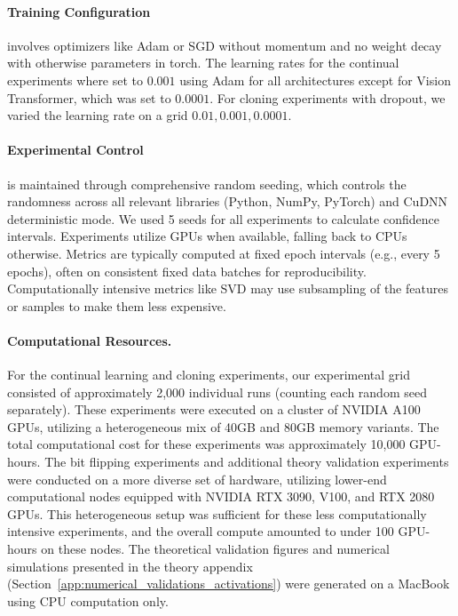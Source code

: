\documentclass{article}
\numberwithin{figure}{section}
\begin{document}
\paragraph{Training Configuration} involves optimizers like Adam or SGD without momentum and no weight decay with otherwise parameters in torch. The learning rates for the continual experiments where set to $0.001$ using Adam for all architectures except for Vision Transformer, which was set to $0.0001.$ For cloning experiments with dropout, we varied the learning rate on a grid $0.01, 0.001, 0.0001.$

\paragraph{Experimental Control} is maintained through comprehensive random seeding, which controls the randomness across all relevant libraries (Python, NumPy, PyTorch) and CuDNN deterministic mode.  We used 5 seeds for all experiments to calculate confidence intervals. Experiments utilize GPUs when available, falling back to CPUs otherwise. Metrics are typically computed at fixed epoch intervals (e.g., every 5 epochs), often on consistent fixed data batches for reproducibility. Computationally intensive metrics like SVD may use subsampling of the features or samples to make them less expensive. 

\paragraph{Computational Resources.}
For the continual learning and cloning experiments, our experimental grid consisted of approximately 2,000 individual runs (counting each random seed separately). These experiments were executed on a cluster of NVIDIA A100 GPUs, utilizing a heterogeneous mix of 40GB and 80GB memory variants. The total computational cost for these experiments was approximately 10,000 GPU-hours.
The bit flipping experiments and additional theory validation experiments were conducted on a more diverse set of hardware, utilizing lower-end computational nodes equipped with NVIDIA RTX 3090, V100, and RTX 2080 GPUs. This heterogeneous setup was sufficient for these less computationally intensive experiments, and the overall compute amounted to under 100 GPU-hours on these nodes.
The theoretical validation figures and numerical simulations presented in the theory appendix (Section~\ref{app:numerical_validations_activations}) were generated on a MacBook using CPU computation only.
\end{document}
